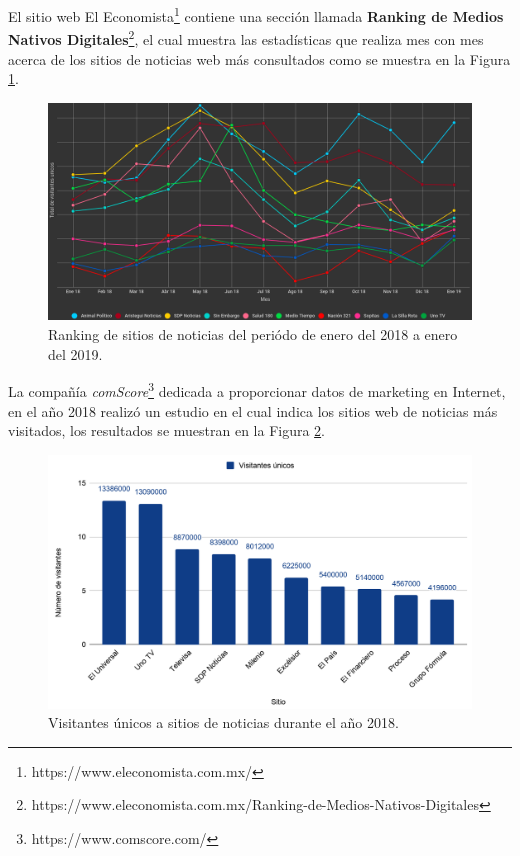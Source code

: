 El sitio web El Economista\footnote{https://www.eleconomista.com.mx/} contiene una sección llamada \textbf{Ranking de Medios Nativos Digitales}\footnote{https://www.eleconomista.com.mx/Ranking-de-Medios-Nativos-Digitales}, el cual muestra las estadísticas que realiza mes con mes acerca de los sitios de noticias web más consultados como se muestra en la Figura \ref{fig:rank}.\\

\begin{figure}[H]
  \centering
  \includegraphics[scale=.15]{imagenes/Capitulo5/ranking.png}
  \caption{Ranking de sitios de noticias del periódo de enero del 2018 a enero del 2019.}
  \label{fig:rank}
\end{figure}

La compañía \textit{comScore}\footnote{https://www.comscore.com/} dedicada a proporcionar datos de marketing en Internet, en el año 2018 realizó un estudio en el cual indica los sitios web de noticias más visitados, los resultados se muestran en la Figura \ref{fig:comScore}.

\begin{figure}[H]
  \centering
  \includegraphics[scale=.32]{imagenes/Capitulo5/visitantesPorSitioComScore.png}
  \caption{Visitantes únicos a sitios de noticias durante el año 2018.}
  \label{fig:comScore}
\end{figure}

